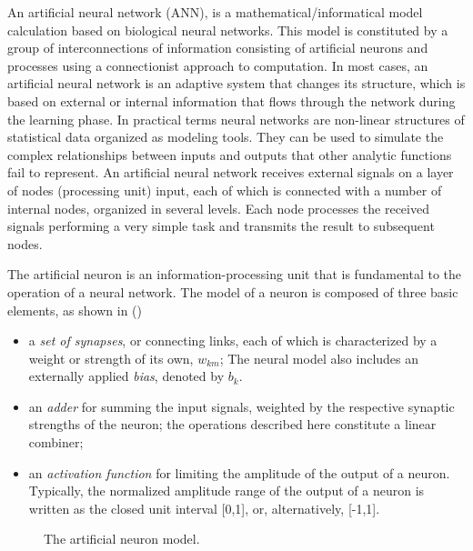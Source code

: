 An artificial neural network (ANN), is a mathematical/informatical model calculation based on biological neural networks.
This model is constituted by a group of interconnections of information consisting of artificial neurons and processes using a connectionist approach to computation. In most cases, an artificial neural network is an adaptive system that changes its structure, which is based on external or internal information that flows through the network during the learning phase. 
In practical terms neural networks are non-linear structures of statistical data organized as modeling tools.
They can be used to simulate the complex relationships between inputs and outputs that other analytic functions fail to represent.
An artificial neural network receives external signals on a layer of nodes (processing unit) input, each of which is connected with a number of internal nodes, organized in several levels. Each node processes the received signals performing a very simple task  and transmits the result to subsequent nodes. 

The artificial neuron is an information-processing unit that is fundamental to the operation of a neural network. The model of a neuron is composed of three basic elements, as shown in () 

\begin{itemize}
\item a \textit{set of synapses}, or connecting links, each of which is characterized by a weight or strength of its own, $w_{km}$; The neural model also includes an externally applied \textit{bias}, denoted by $b_k$.
\item an \textit{adder} for summing the input signals, weighted by the respective synaptic strengths of the neuron; the operations described here constitute a linear combiner;
\item an \textit{activation function} for limiting the amplitude of the output of a neuron. Typically, the normalized amplitude range of the output of a neuron is written as the closed unit interval [0,1], or, alternatively, [-1,1].
\end{itemize}



\begin{figure}[h]
	\centering
	
	\caption{The artificial neuron model.}
	\label{fig:artificial_neuron}
\end{figure}

